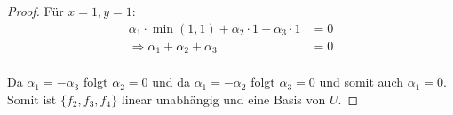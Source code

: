 \documentclass{../problemset}
\begin{document}
\begin{problem}
\begin{proof}
    Für $x = 1, y = 1$:
    \begin{align*}
        \alpha_1 \cdot \min(1, 1) + \alpha_2 \cdot 1 + \alpha_3 \cdot 1 & = 0 \\
        \Rightarrow \alpha_1 + \alpha_2 + \alpha_3                      & = 0 \\
    \end{align*}

    Da $\alpha_1 = - \alpha_3$ folgt $\alpha_2 = 0$ und da $\alpha_1 = - \alpha_2$ folgt $\alpha_3 = 0$ und somit auch $\alpha_1 = 0$.
    Somit ist $\{f_2, f_3, f_4\}$ linear unabhängig und eine Basis von $U$.

\end{proof}
\end{problem}

\pagebreak
\end{document}
